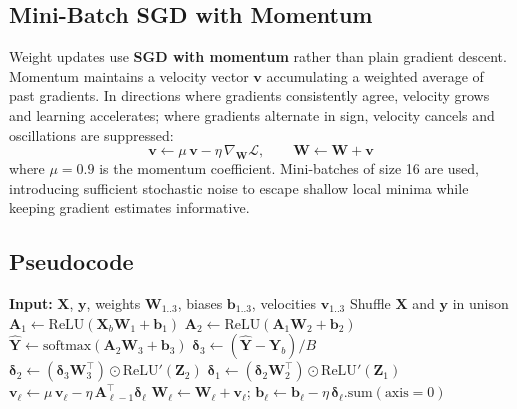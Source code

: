 \documentclass[12pt]{article}
\begin{document}
\subsection{Mini-Batch SGD with Momentum}

Weight updates use \textbf{SGD with momentum} rather than plain gradient descent.
Momentum maintains a velocity vector $\mathbf{v}$ accumulating a weighted average of
past gradients. In directions where gradients consistently agree, velocity grows and
learning accelerates; where gradients alternate in sign, velocity cancels and oscillations
are suppressed:
\[
  \mathbf{v} \leftarrow \mu\,\mathbf{v} - \eta\,\nabla_\mathbf{W}\mathcal{L},
  \qquad \mathbf{W} \leftarrow \mathbf{W} + \mathbf{v}
\]
where $\mu = 0.9$ is the momentum coefficient. Mini-batches of size 16 are used,
introducing sufficient stochastic noise to escape shallow local minima while keeping
gradient estimates informative.

\subsection{Pseudocode}

\begin{algorithm}[H]
\caption{Neural Network Training (Scratch) --- One Epoch}
\begin{algorithmic}[1]
\State \textbf{Input:} $\mathbf{X}$, $\mathbf{y}$,
       weights $\mathbf{W}_{1..3}$, biases $\mathbf{b}_{1..3}$,
       velocities $\mathbf{v}_{1..3}$
\State Shuffle $\mathbf{X}$ and $\mathbf{y}$ in unison
  \State {}
  \State $\mathbf{A}_1 \leftarrow \text{ReLU}(\mathbf{X}_b\mathbf{W}_1 + \mathbf{b}_1)$
  \State $\mathbf{A}_2 \leftarrow \text{ReLU}(\mathbf{A}_1\mathbf{W}_2 + \mathbf{b}_2)$
  \State $\hat{\mathbf{Y}} \leftarrow
         \text{softmax}(\mathbf{A}_2\mathbf{W}_3 + \mathbf{b}_3)$
  \State {}
  \State $\boldsymbol{\delta}_3 \leftarrow (\hat{\mathbf{Y}} - \mathbf{Y}_b)/B$
  \State $\boldsymbol{\delta}_2 \leftarrow
         (\boldsymbol{\delta}_3 \mathbf{W}_3^\top)
         \odot \text{ReLU}'(\mathbf{Z}_2)$
  \State $\boldsymbol{\delta}_1 \leftarrow
         (\boldsymbol{\delta}_2 \mathbf{W}_2^\top)
         \odot \text{ReLU}'(\mathbf{Z}_1)$
  \State {}
    \State $\mathbf{v}_\ell \leftarrow
           \mu\,\mathbf{v}_\ell -
           \eta\,\mathbf{A}_{\ell-1}^\top\boldsymbol{\delta}_\ell$
    \State $\mathbf{W}_\ell \leftarrow \mathbf{W}_\ell + \mathbf{v}_\ell$;\quad
           $\mathbf{b}_\ell \leftarrow
           \mathbf{b}_\ell - \eta\,\boldsymbol{\delta}_\ell.\text{sum}(\text{axis}=0)$
  \EndFor
\EndFor
\end{algorithmic}
\end{algorithm}
\end{document}

